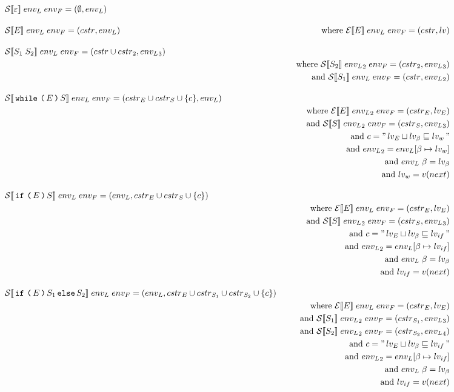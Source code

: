 \begin{align*}
& \iS\dblSq{\varepsilon} \; \ienvL \; \ienvF = (\emptyset, \ienvL) \seSpace
%
& \iS\dblSq{E} \; \ienvL \; \ienvF = (\icstr, \ienvL) \seWhere{\iE\dblSq{E} \; \ienvL \; \ienvF = (\icstr, \ilv)} \seSpace
%
& \iS\dblSq{S_1 \; S_2} \; \ienvL \; \ienvF = (\icstr \cup \icstr_2, \ienvL_3) \\
& \seWhere{\iS\dblSq{S_2} \; \ienvL_2 \; \ienvF = (\icstr_2, \ienvL_3)} \\
& \seAnd{\iS\dblSq{S_1} \; \ienvL \; \ienvF = (\icstr, \ienvL_2)} \seSpace
%
& \iS\dblSq{\tk{while} \tk ( E \tk ) S} \; \ienvL \; \ienvF = (\icstr_E \cup \icstr_S \cup \{ c \}, \ienvL) \\
& \seWhere{\iE\dblSq{E} \; \ienvL_2 \; \ienvF = (\icstr_E, \ilv_E)} \\
& \seAnd{\iS\dblSq{S} \; \ienvL_2 \; \ienvF = (\icstr_S, \ienvL_3)} \\
& \seAnd{c = \literal{\ilv_E \sqcup \ilv_\ib \sqsubseteq \ilv_w}} \\
& \seAnd{\ienvL_2 = \ienvL[\ib \mapsto \ilv_w]} \\
& \seAnd{\ienvL \; \ib = \ilv_\ib} \\
& \seAnd{\ilv_w = v(next)} \seSpace
%
& \iS\dblSq{\tk{if} \tk ( E \tk ) S} \; \ienvL \; \ienvF = (\ienvL, \icstr_E \cup \icstr_S \cup \{ c \}) \\
& \seWhere{\iE\dblSq{E} \; \ienvL \; \ienvF = (\icstr_E, \ilv_E)} \\
& \seAnd{\iS\dblSq{S} \; \ienvL_2 \; \ienvF = (\icstr_S, \ienvL_3)} \\
& \seAnd{c = \literal{\ilv_E \sqcup \ilv_\ib \sqsubseteq \ilv_{if}}} \\
& \seAnd{\ienvL_2 = \ienvL[\ib \mapsto \ilv_{if}]} \\
& \seAnd{\ienvL \; \ib = \ilv_\ib} \\
& \seAnd{\ilv_{if} = v(next)} \seSpace
%
& \iS\dblSq{\tk{if} \tk ( E \tk ) S_1 \tk{else} S_2} \; \ienvL \; \ienvF = (\ienvL, \icstr_E \cup \icstr_{S_1} \cup \icstr_{S_2} \cup \{ c \}) \\
& \seWhere{\iE\dblSq{E} \; \ienvL \; \ienvF = (\icstr_E, \ilv_E)} \\
& \seAnd{\iS\dblSq{S_1} \; \ienvL_2 \; \ienvF = (\icstr_{S_1}, \ienvL_3)} \\
& \seAnd{\iS\dblSq{S_2} \; \ienvL_2 \; \ienvF = (\icstr_{S_2}, \ienvL_4)} \\
& \seAnd{c = \literal{\ilv_E \sqcup \ilv_\ib \sqsubseteq \ilv_{if}}} \\
& \seAnd{\ienvL_2 = \ienvL[\ib \mapsto \ilv_{if}]} \\
& \seAnd{\ienvL \; \ib = \ilv_\ib} \\
& \seAnd{\ilv_{if} = v(next)}
\end{align*}

